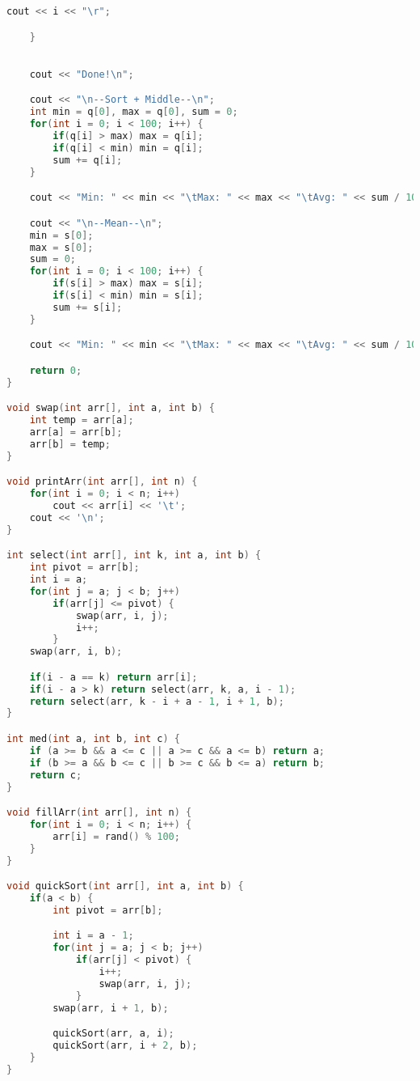 \documentclass[letterpaper, 11pt]{article}
\begin{document}
\begin{lstlisting}[language=c++, caption=main.cpp]
        cout << i << "\r";

    }
    

    cout << "Done!\n";

    cout << "\n--Sort + Middle--\n";
    int min = q[0], max = q[0], sum = 0;
    for(int i = 0; i < 100; i++) {
        if(q[i] > max) max = q[i];
        if(q[i] < min) min = q[i];
        sum += q[i];
    }

    cout << "Min: " << min << "\tMax: " << max << "\tAvg: " << sum / 100 << '\n';

    cout << "\n--Mean--\n";
    min = s[0];
    max = s[0];
    sum = 0;
    for(int i = 0; i < 100; i++) {
        if(s[i] > max) max = s[i];
        if(s[i] < min) min = s[i];
        sum += s[i];
    }

    cout << "Min: " << min << "\tMax: " << max << "\tAvg: " << sum / 100 << '\n';

    return 0;
}

void swap(int arr[], int a, int b) {
    int temp = arr[a];
    arr[a] = arr[b];
    arr[b] = temp;
}

void printArr(int arr[], int n) {
    for(int i = 0; i < n; i++)
        cout << arr[i] << '\t';
    cout << '\n';
}

int select(int arr[], int k, int a, int b) {
    int pivot = arr[b];
    int i = a;
    for(int j = a; j < b; j++) 
        if(arr[j] <= pivot) {
            swap(arr, i, j);
            i++;
        }
    swap(arr, i, b);

    if(i - a == k) return arr[i];
    if(i - a > k) return select(arr, k, a, i - 1);
    return select(arr, k - i + a - 1, i + 1, b);
}

int med(int a, int b, int c) {
    if (a >= b && a <= c || a >= c && a <= b) return a;
    if (b >= a && b <= c || b >= c && b <= a) return b;
    return c;
}

void fillArr(int arr[], int n) {
    for(int i = 0; i < n; i++) {
        arr[i] = rand() % 100;
    }
}

void quickSort(int arr[], int a, int b) {
    if(a < b) {
        int pivot = arr[b];

        int i = a - 1;
        for(int j = a; j < b; j++) 
            if(arr[j] < pivot) {
                i++;
                swap(arr, i, j);
            }
        swap(arr, i + 1, b);

        quickSort(arr, a, i);
        quickSort(arr, i + 2, b);
    }
}
\end{lstlisting}

\pagebreak
\end{document}
